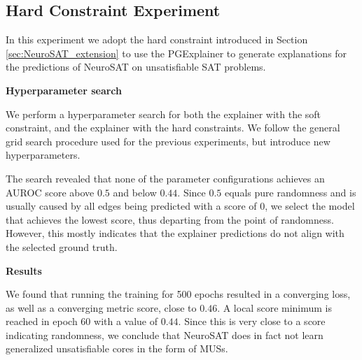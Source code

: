 \subsection{Hard Constraint Experiment}
In this experiment we adopt the hard constraint introduced in Section \ref{sec:NeuroSAT_extension} to use the PGExplainer to generate explanations for the predictions of NeuroSAT on unsatisfiable SAT problems. \bigskip

\textbf{Hyperparameter search}\par
We perform a hyperparameter search for both the explainer with the soft constraint, and the explainer with the hard constraints. We follow the general grid search procedure used for the previous experiments, but introduce new hyperparameters. 

The search revealed that none of the parameter configurations achieves an AUROC score above $0.5$ and below $0.44$. Since $0.5$ equals pure randomness and is usually caused by all edges being predicted with a score of $0$, we select the model that achieves the lowest score, thus departing from the point of randomness. However, this mostly indicates that the explainer predictions do not align with the selected ground truth.

\textbf{Results}\par
We found that running the training for 500 epochs resulted in a converging loss, as well as a converging metric score, close to $0.46$. A local score minimum is reached in epoch 60 with a value of $0.44$. Since this is very close to a score indicating randomness, we conclude that NeuroSAT does in fact not learn generalized unsatisfiable cores in the form of MUSs.